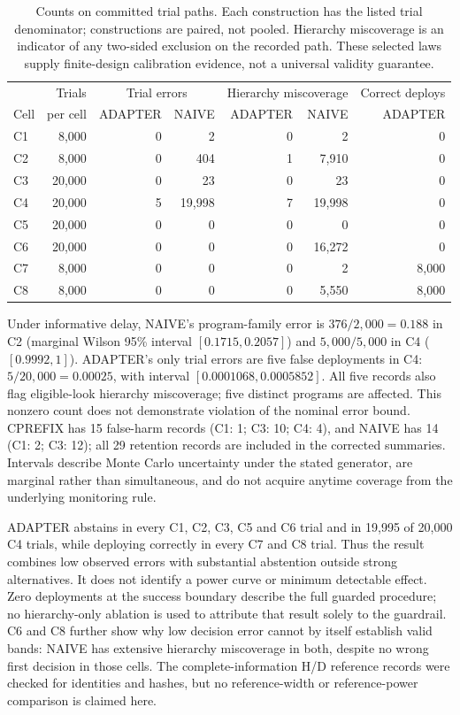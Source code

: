 \begin{table}[ht]
\centering\small
\begin{tabular}{lrrrrrr}
\toprule
& Trials & \multicolumn{2}{c}{Trial errors} & \multicolumn{2}{c}{Hierarchy miscoverage} & Correct deploys\\
Cell & per cell & ADAPTER & NAIVE & ADAPTER & NAIVE & ADAPTER\\
\midrule
C1 & 8,000 & 0 & 2 & 0 & 2 & 0\\
C2 & 8,000 & 0 & 404 & 1 & 7,910 & 0\\
C3 & 20,000 & 0 & 23 & 0 & 23 & 0\\
C4 & 20,000 & 5 & 19,998 & 7 & 19,998 & 0\\
C5 & 20,000 & 0 & 0 & 0 & 0 & 0\\
C6 & 20,000 & 0 & 0 & 0 & 16,272 & 0\\
C7 & 8,000 & 0 & 0 & 0 & 2 & 8,000\\
C8 & 8,000 & 0 & 0 & 0 & 5,550 & 8,000\\
\bottomrule
\end{tabular}
\caption{Counts on committed trial paths. Each construction has the listed trial
denominator; constructions are paired, not pooled. Hierarchy miscoverage is an
indicator of any two-sided exclusion on the recorded path. These selected laws
supply finite-design calibration evidence, not a universal validity guarantee.}
\label{tab:t1_validation}
\end{table}

Under informative delay, NAIVE's program-family error is $376/2{,}000=0.188$
in C2 (marginal Wilson 95\% interval $[0.1715,0.2057]$) and $5{,}000/5{,}000$
in C4 ($[0.9992,1]$). ADAPTER's only trial errors are five false deployments in
C4: $5/20{,}000=0.00025$, with interval $[0.0001068,0.0005852]$.
All five records also flag eligible-look hierarchy miscoverage; five distinct
programs are affected. This nonzero count does not demonstrate violation of the
nominal error bound. CPREFIX has 15 false-harm records (C1: 1; C3: 10; C4: 4),
and NAIVE has 14 (C1: 2; C3: 12); all 29 retention records are included in the
corrected summaries. Intervals describe Monte Carlo uncertainty under the stated
generator, are marginal rather than simultaneous, and do not acquire anytime
coverage from the underlying monitoring rule.

ADAPTER abstains in every C1, C2, C3, C5 and C6 trial and in 19,995 of 20,000
C4 trials, while deploying correctly in every C7 and C8 trial. Thus the result
combines low observed errors with substantial abstention outside strong
alternatives. It does not identify a power curve or minimum detectable effect.
Zero deployments at the success boundary describe the full guarded procedure;
no hierarchy-only ablation is used to attribute that result solely to the guardrail.
C6 and C8 further show why low decision error cannot by itself establish valid
bands: NAIVE has extensive hierarchy miscoverage in both, despite no wrong
first decision in those cells. The complete-information H/D reference records
were checked for identities and hashes, but no reference-width or reference-power
comparison is claimed here.

